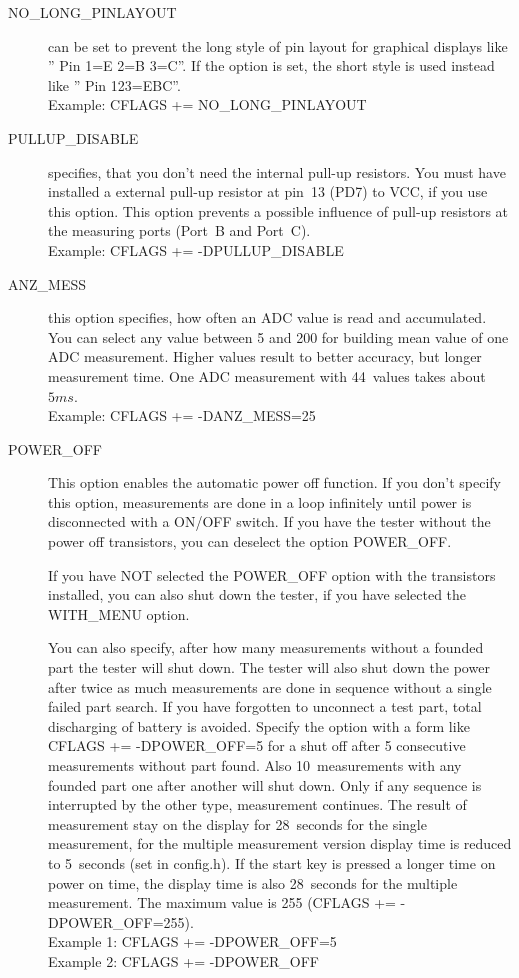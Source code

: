 \begin{description}
  \item[NO\_LONG\_PINLAYOUT] can be set to prevent the long style of pin layout for graphical displays 
 like '' Pin  1=E 2=B 3=C''.
If the option is set, the short style is used instead like '' Pin  123=EBC''.\\
Example: CFLAGS += NO\_LONG\_PINLAYOUT

\item[PULLUP\_DISABLE] specifies, that you don't need the internal pull-up resistors.
 You must have installed a external pull-up resistor at pin~13 (PD7) to VCC, if you use this option.
This option prevents a possible influence of pull-up resistors at the measuring ports (Port~B and Port~C).\\
Example: CFLAGS += -DPULLUP\_DISABLE

  \item[ANZ\_MESS] this option specifies, how often an ADC value is read and accumulated.
You can select any value between 5 and 200 for building mean value of one ADC measurement.
Higher values result to better accuracy, but  longer measurement time.
One ADC measurement with 44~values takes about \(5ms\).\\
Example: CFLAGS += -DANZ\_MESS=25

  \item[POWER\_OFF] This option enables the automatic power off function. If you don't specify this option,
 measurements are done in a loop infinitely  until power is disconnected with a ON/OFF switch.
If you have the tester without the power off transistors, you can deselect the option POWER\_OFF.

If you have NOT selected the POWER\_OFF option with the transistors installed,
you can also shut down the tester, if you have selected the WITH\_MENU option.

You can also specify, after how many measurements without a founded part the tester will shut down.
The tester will also shut down the power after twice as much measurements are done in sequence without a
single failed part search. If you have forgotten to unconnect a test part, total discharging of battery is avoided. 
Specify the option with a form like CFLAGS += -DPOWER\_OFF=5 for a shut off after 5 consecutive measurements
without part found. Also 10~measurements with any founded part one after another will shut down.
Only if any sequence is interrupted by the other type, measurement continues.
The result of measurement stay on the display for 28~seconds for the single measurement, for the
multiple measurement version display time is reduced to 5~seconds (set in config.h).
If the start key is pressed a longer time on power on time, the display time is also 28~seconds for the multiple measurement.
The maximum value is 255 (CFLAGS += -DPOWER\_OFF=255).\\
Example 1: CFLAGS += -DPOWER\_OFF=5\\
Example 2: CFLAGS += -DPOWER\_OFF


\end{description}
